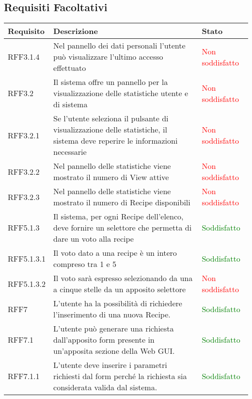 \subsection{Requisiti Facoltativi}
\begin{center}

	\def\arraystretch{1.5}
	\bgroup
	\begin{longtable}{| p{2.5cm} | p{8cm} | p{3.5cm} |}

		\hline
		\textbf{Requisito} & \textbf{Descrizione} & \textbf{Stato} \\
		\hline
		RFF3.1.4  &  Nel pannello dei dati personali l'utente può visualizzare l'ultimo accesso effettuato  &  \textcolor{red}{ Non soddisfatto} \\
		\hline
		RFF3.2  &  Il sistema offre un pannello per la visualizzazione delle statistiche utente e di sistema  &  \textcolor{red}{ Non soddisfatto} \\
		\hline
		RFF3.2.1  &  Se l'utente seleziona il pulsante di visualizzazione delle statistiche, il sistema deve reperire le informazioni necessarie  &  \textcolor{red}{ Non soddisfatto} \\
		\hline
		RFF3.2.2 &  Nel pannello delle statistiche viene mostrato il numero di View attive &  \textcolor{red}{ Non soddisfatto} \\
		\hline
		RFF3.2.3  &  Nel pannello delle statistiche viene mostrato il numero di Recipe disponibili &  \textcolor{red}{ Non soddisfatto} \\
		\hline
		RFF5.1.3  & Il sistema, per ogni Recipe dell'elenco, deve fornire un selettore che permetta di dare un voto alla recipe &  \textcolor{green}{Soddisfatto} \\
		\hline
		RFF5.1.3.1  & Il voto dato a una recipe è un intero compreso tra 1 e 5 &  \textcolor{green}{Soddisfatto} \\
		\hline
		RFF5.1.3.2  & Il voto sarà espresso selezionando da una a cinque stelle da un apposito selettore &  \textcolor{red}{ Non soddisfatto} \\
		\hline
		RFF7  & L'utente ha la possibilità di richiedere l'inserimento di una nuova Recipe. & \textcolor{green}{Soddisfatto} \\
		\hline
		RFF7.1  & L'utente può generare una richiesta dall'apposito form presente in un'apposita sezione della Web GUI. & \textcolor{green}{Soddisfatto} \\
		\hline
		RFF7.1.1 & L'utente deve inserire i parametri richiesti dal form perché la richiesta sia considerata valida dal sistema. & \textcolor{green}{Soddisfatto}  \\

\end{longtable}
\end{center}
